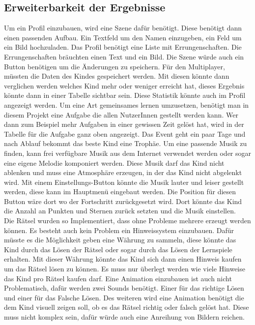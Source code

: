 \subsection{Erweiterbarkeit der Ergebnisse}
\label{sub:erweiterbarkeit}

Um ein Profil einzubauen, wird eine Szene dafür benötigt. Diese benötigt dann einen passenden Aufbau. Ein Textfeld um den Namen einzugeben, ein Feld um ein Bild hochzuladen. Das Profil benötigt eine Liste mit Errungenschaften. Die Errungenschaften bräuchten einen Text und ein Bild. Die Szene würde auch ein Button benötigen um die Änderungen zu speichern. Für den Multiplayer, müssten die Daten des Kindes gespeichert werden. Mit diesen könnte dann verglichen werden welches Kind mehr oder weniger erreicht hat, dieses Ergebnis könnte dann in einer Tabelle sichtbar sein. Diese Statistik könnte auch im Profil angezeigt werden. Um eine Art gemeinsames lernen umzusetzen, benötigt man in diesem Projekt eine Aufgabe die allen NutzerInnen gestellt werden kann. Wer dann zum Beispiel mehr Aufgaben in einer gewissen Zeit gelöst hat, wird in der Tabelle für die Aufgabe ganz oben angezeigt. Das Event geht ein paar Tage und nach Ablauf bekommt das beste Kind eine Trophäe. Um eine passende Musik zu finden, kann frei verfügbare Musik aus dem Internet verwendet werden oder sogar eine eigene Melodie komponiert werden. Diese Musik darf das Kind nicht ablenken und muss eine Atmosphäre erzeugen, in der das Kind nicht abgelenkt wird. Mit einem Einstellungs-Button könnte die Musik lauter und leiser gestellt werden, diese kann im Hauptmenü eingebaut werden. Die Position für diesen Button wäre dort wo der Fortschritt zurückgesetzt wird. Dort könnte das Kind die Anzahl an Punkten und Sternen zurück setzten und die Musik einstellen.\\
Die Rätsel wurden so Implementiert, dass ohne Probleme mehrere erzeugt werden können. Es besteht auch kein Problem ein Hinweissystem einzubauen. Dafür müsste es die Möglichkeit geben eine Währung zu sammeln, diese könnte das Kind durch das Lösen der Rätsel oder sogar durch das Lösen der Lernspiele erhalten. Mit dieser Währung könnte das Kind sich dann einen Hinweis kaufen um das Rätsel lösen zu können. Es muss nur überlegt werden wie viele Hinweise das Kind pro Rätsel kaufen darf. Eine Animation einzubauen ist auch nicht Problematisch, dafür werden zwei Sounds benötigt. Einer für das richtige Lösen und einer für das Falsche Lösen. Des weiteren wird eine Animation benötigt die dem Kind visuell zeigen soll, ob es das Rätsel richtig oder falsch gelöst hat. Diese muss nicht komplex sein, dafür würde auch eine Anreihung von Bildern reichen. \\
